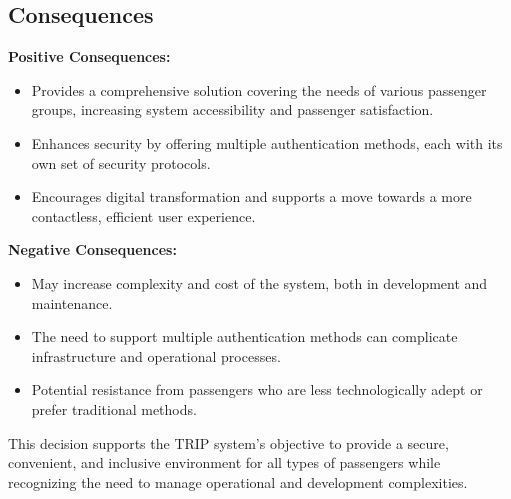 \subsection*{Consequences}
\textbf{Positive Consequences:}
\begin{itemize}
    \item Provides a comprehensive solution covering the needs of various passenger groups, increasing system accessibility and passenger satisfaction.
    \item Enhances security by offering multiple authentication methods, each with its own set of security protocols.
    \item Encourages digital transformation and supports a move towards a more contactless, efficient user experience.
\end{itemize}
\textbf{Negative Consequences:}
\begin{itemize}
    \item May increase complexity and cost of the system, both in development and maintenance.
    \item The need to support multiple authentication methods can complicate infrastructure and operational processes.
    \item Potential resistance from passengers who are less technologically adept or prefer traditional methods.
\end{itemize}
This decision supports the TRIP system's objective to provide a secure, convenient, and inclusive environment for all types of passengers while recognizing the need to manage operational and development complexities.
